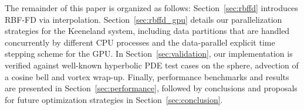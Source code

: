 The remainder of this paper is organized as follows: Section~\ref{sec:rbffd} introduces RBF-FD via interpolation. Section~\ref{sec:rbffd_gpu} details our parallelization strategies for the Keeneland system, including data partitions that are handled concurrently by different CPU processes and the data-parallel explicit time stepping scheme for the GPU. In Section~\ref{sec:validation}, our implementation is verified against well-known hyperbolic PDE test cases on the sphere, advection of a cosine bell and vortex wrap-up. Finally, performance benchmarks and results are presented in Section~\ref{sec:performance}, followed by conclusions and proposals for future optimization strategies in Section~\ref{sec:conclusion}.

